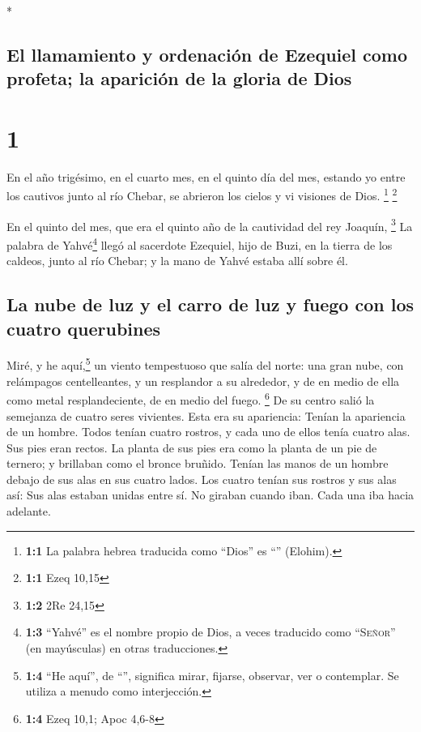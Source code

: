 \begin{paracol}{2} \switchcolumn[0]*

\hypertarget{el-llamamiento-y-ordenaciuxf3n-de-ezequiel-como-profeta-la-apariciuxf3n-de-la-gloria-de-dios}{%
\subsection{El llamamiento y ordenación de Ezequiel como profeta; la
aparición de la gloria de
Dios}\label{el-llamamiento-y-ordenaciuxf3n-de-ezequiel-como-profeta-la-apariciuxf3n-de-la-gloria-de-dios}}

\hypertarget{section}{%
\section{1}\label{section}}

 En el año trigésimo, en el cuarto mes, en el quinto día
del mes, estando yo entre los cautivos junto al río Chebar, se abrieron
los cielos y vi visiones de Dios. \footnote{\textbf{1:1} La palabra
  hebrea traducida como ``Dios'' es ``'' (Elohim).}
\footnote{\textbf{1:1} Ezeq 10,15}

 En el quinto del mes, que era el quinto año de la
cautividad del rey Joaquín, \footnote{\textbf{1:2} 2Re 24,15}
 La palabra de Yahvé\footnote{\textbf{1:3} ``Yahvé'' es el
  nombre propio de Dios, a veces traducido como ``\textsc{Señor}'' (en
  mayúsculas) en otras traducciones.} llegó al sacerdote Ezequiel, hijo
de Buzi, en la tierra de los caldeos, junto al río Chebar; y la mano de
Yahvé estaba allí sobre él.

\hypertarget{la-nube-de-luz-y-el-carro-de-luz-y-fuego-con-los-cuatro-querubines}{%
\subsection{La nube de luz y el carro de luz y fuego con los cuatro
querubines}\label{la-nube-de-luz-y-el-carro-de-luz-y-fuego-con-los-cuatro-querubines}}

 Miré, y he aquí,\footnote{\textbf{1:4} ``He aquí'', de
  ``'', significa mirar, fijarse, observar, ver o
  contemplar. Se utiliza a menudo como interjección.} un viento
tempestuoso que salía del norte: una gran nube, con relámpagos
centelleantes, y un resplandor a su alrededor, y de en medio de ella
como metal resplandeciente, de en medio del fuego. \footnote{\textbf{1:4}
  Ezeq 10,1; Apoc 4,6-8}  De su centro salió la semejanza
de cuatro seres vivientes. Esta era su apariencia: Tenían la apariencia
de un hombre.  Todos tenían cuatro rostros, y cada uno de
ellos tenía cuatro alas.  Sus pies eran rectos. La planta
de sus pies era como la planta de un pie de ternero; y brillaban como el
bronce bruñido.  Tenían las manos de un hombre debajo de
sus alas en sus cuatro lados. Los cuatro tenían sus rostros y sus alas
así:  Sus alas estaban unidas entre sí. No giraban cuando
iban. Cada una iba hacia adelante.


\end{paracol}
